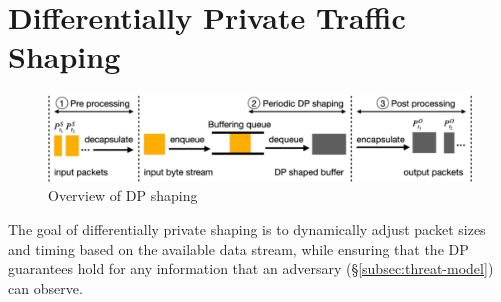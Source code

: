 \section{Differentially Private Traffic Shaping}
\label{sec:dp}

\begin{figure}[t]
    \centering
    \includegraphics[width=\columnwidth]{dp-overview.pdf}
    \caption{Overview of DP shaping}
    \vspace{-0.4cm}
    \label{fig:dp-overview}
\end{figure}

The goal of differentially private shaping is to dynamically adjust packet
sizes and timing based on the available data stream, while ensuring that the DP
guarantees hold for any information that an adversary
(\S\ref{subsec:threat-model}) can observe.


